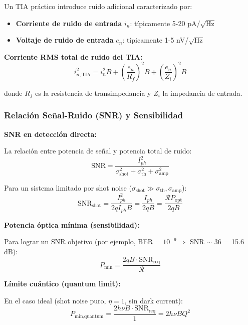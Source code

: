 \documentclass[11pt,a4paper]{article}
\begin{document}
Un TIA práctico introduce ruido adicional caracterizado por:
\begin{itemize}
    \item \textbf{Corriente de ruido de entrada} $i_n$: típicamente 5-20 pA/$\sqrt{\text{Hz}}$
    \item \textbf{Voltaje de ruido de entrada} $e_n$: típicamente 1-5 nV/$\sqrt{\text{Hz}}$
\end{itemize}

\textbf{Corriente RMS total de ruido del TIA:}
\begin{equation}
    i_{n,\text{TIA}}^2 = i_n^2 B + \left(\frac{e_n}{R_f}\right)^2 B + \left(\frac{e_n}{Z_i}\right)^2 B
\end{equation}

donde $R_f$ es la resistencia de transimpedancia y $Z_i$ la impedancia de entrada.

\subsubsection{Relación Señal-Ruido (SNR) y Sensibilidad}

\textbf{SNR en detección directa:}

La relación entre potencia de señal y potencia total de ruido:
\begin{equation}
    \text{SNR} = \frac{I_{ph}^2}{\sigma_{\text{shot}}^2 + \sigma_{\text{th}}^2 + \sigma_{\text{amp}}^2}
\end{equation}

Para un sistema limitado por shot noise ($\sigma_{\text{shot}} \gg \sigma_{\text{th}}, \sigma_{\text{amp}}$):
\begin{equation}
    \text{SNR}_{\text{shot}} = \frac{I_{ph}^2}{2q I_{ph} B} = \frac{I_{ph}}{2qB} = \frac{\mathcal{R}P_{\text{opt}}}{2qB}
\end{equation}

\textbf{Potencia óptica mínima (sensibilidad):}

Para lograr un SNR objetivo (por ejemplo, BER = $10^{-9} \Rightarrow$ SNR $\sim$ 36 = 15.6 dB):
\begin{equation}
    P_{\text{min}} = \frac{2qB \cdot \text{SNR}_{\text{req}}}{\mathcal{R}}
\end{equation}

\textbf{Límite cuántico (quantum limit):}

En el caso ideal (shot noise puro, $\eta = 1$, sin dark current):
\begin{equation}
    P_{\text{min,quantum}} = \frac{2h\nu B \cdot \text{SNR}_{\text{req}}}{1} = 2h\nu B Q^2
\end{equation}
\end{document}
